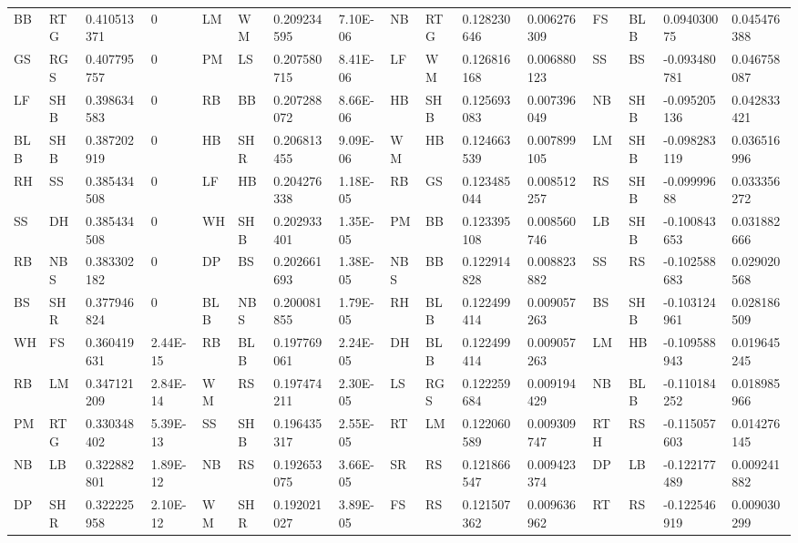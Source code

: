 \begin{table}[]
\begin{tabular}{llllllllllllllll}
BB  & RTG    & 0.410513371 & 0        & LM  & WM     & 0.209234595 & 7.10E-06    & NB  & RTG    & 0.128230646 & 0.006276309 & FS  & BLB    & 0.094030075  & 0.045476388 \\
GS  & RGS    & 0.407795757 & 0        & PM  & LS     & 0.207580715 & 8.41E-06    & LF  & WM     & 0.126816168 & 0.006880123 & SS  & BS     & -0.093480781 & 0.046758087 \\
LF  & SHB    & 0.398634583 & 0        & RB  & BB     & 0.207288072 & 8.66E-06    & HB  & SHB    & 0.125693083 & 0.007396049 & NB  & SHB    & -0.095205136 & 0.042833421 \\
BLB & SHB    & 0.387202919 & 0        & HB  & SHR    & 0.206813455 & 9.09E-06    & WM  & HB     & 0.124663539 & 0.007899105 & LM  & SHB    & -0.098283119 & 0.036516996 \\
RH  & SS     & 0.385434508 & 0        & LF  & HB     & 0.204276338 & 1.18E-05    & RB  & GS     & 0.123485044 & 0.008512257 & RS  & SHB    & -0.09999688  & 0.033356272 \\
SS  & DH     & 0.385434508 & 0        & WH  & SHB    & 0.202933401 & 1.35E-05    & PM  & BB     & 0.123395108 & 0.008560746 & LB  & SHB    & -0.100843653 & 0.031882666 \\
RB  & NBS    & 0.383302182 & 0        & DP  & BS     & 0.202661693 & 1.38E-05    & NBS & BB     & 0.122914828 & 0.008823882 & SS  & RS     & -0.102588683 & 0.029020568 \\
BS  & SHR    & 0.377946824 & 0        & BLB & NBS    & 0.200081855 & 1.79E-05    & RH  & BLB    & 0.122499414 & 0.009057263 & BS  & SHB    & -0.103124961 & 0.028186509 \\
WH  & FS     & 0.360419631 & 2.44E-15 & RB  & BLB    & 0.197769061 & 2.24E-05    & DH  & BLB    & 0.122499414 & 0.009057263 & LM  & HB     & -0.109588943 & 0.019645245 \\
RB  & LM     & 0.347121209 & 2.84E-14 & WM  & RS     & 0.197474211 & 2.30E-05    & LS  & RGS    & 0.122259684 & 0.009194429 & NB  & BLB    & -0.110184252 & 0.018985966 \\
PM  & RTG    & 0.330348402 & 5.39E-13 & SS  & SHB    & 0.196435317 & 2.55E-05    & RT  & LM     & 0.122060589 & 0.009309747 & RTH & RS     & -0.115057603 & 0.014276145 \\
NB  & LB     & 0.322882801 & 1.89E-12 & NB  & RS     & 0.192653075 & 3.66E-05    & SR  & RS     & 0.121866547 & 0.009423374 & DP  & LB     & -0.122177489 & 0.009241882 \\
DP  & SHR    & 0.322225958 & 2.10E-12 & WM  & SHR    & 0.192021027 & 3.89E-05    & FS  & RS     & 0.121507362 & 0.009636962 & RT  & RS     & -0.122546919 & 0.009030299 \\

\end{tabular}
\end{table}

